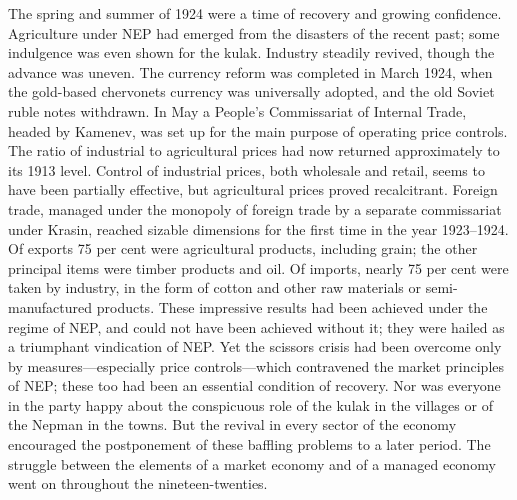 The spring and summer of 1924 were a time of recovery and growing confidence. Agriculture under NEP had emerged from the disasters of the recent past; some indulgence was even shown for the kulak. Industry steadily revived, though the advance was uneven. The currency reform was completed in March 1924, when the gold-based chervonets currency was universally adopted, and the old Soviet ruble notes withdrawn. In May a People's Commissariat of Internal Trade, headed by Kamenev, was set up for the main purpose of operating price controls. The ratio of industrial to agricultural prices had now returned approximately to its 1913 level. Control of industrial prices, both wholesale and retail, seems to have been partially effective, but agricultural prices proved recalcitrant. Foreign trade, managed under the monopoly of foreign trade by a separate commissariat under Krasin, reached sizable dimensions for the first time in the year 1923--1924. Of exports 75 per cent were agricultural products, including grain; the other principal items were timber products and oil. Of imports, nearly 75 per cent were taken by industry, in the form of cotton and other raw materials or semi-manufactured products. These impressive results had been achieved under the regime of NEP, and could not have been achieved without it; they were hailed as a triumphant vindication of NEP. Yet the scissors crisis had been overcome only by measures---especially price controls---which contravened the market principles of NEP; these too had been an essential condition of recovery. Nor was everyone in the party happy about the conspicuous role of the kulak in the villages or of the Nepman in the towns. But the revival in every sector of the economy encouraged the postponement of these baffling problems to a later period. The struggle between the elements of a market economy and of a managed economy went on throughout the nineteen-twenties. 
